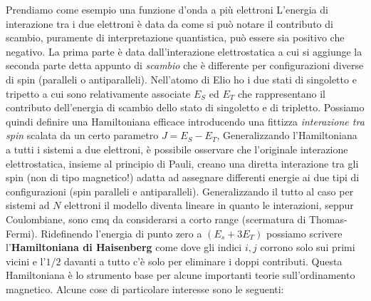 Prendiamo come esempio una funzione d'onda a pi\`u elettroni 
L'energia di interazione tra i due elettroni \`e data da
come si pu\`o notare il contributo di scambio, puramente di interpretazione quantistica, pu\`o essere sia positivo che negativo. La prima parte \`e data dall'interazione elettrostatica a cui si aggiunge la seconda parte detta appunto di \textit{scambio} che \`e differente per configurazioni diverse di spin (paralleli o antiparalleli). Nell'atomo di Elio ho i due stati di singoletto e tripetto a cui sono relativamente associate $E_S$ ed $E_T$ che rappresentano il contributo dell'energia di scambio dello stato di singoletto e di tripletto. Possiamo quindi definire una Hamiltoniana efficace introducendo una fittizza \textit{interazione tra spin} scalata da un certo parametro $J = E_S-E_T$, 
Generalizzando l'Hamiltoniana a tutti i sistemi a due elettroni, \`e possibile osservare che l'originale interazione elettrostatica, insieme al principio di Pauli, creano una diretta interazione tra gli spin (non di tipo magnetico!) adatta ad assegnare differenti energie ai due tipi di configurazioni (spin paralleli e antiparalleli). Generalizzando il tutto al caso per sistemi ad $N$ elettroni il modello diventa lineare in quanto le interazioni, seppur Coulombiane, sono cmq da considerarsi a corto range (scermatura di Thomas-Fermi). Ridefinendo l'energia di punto zero a $(E_s+3E_T)$ possiamo scrivere l'\textbf{Hamiltoniana di Haisenberg} come
dove gli indici $i,j$ corrono solo sui primi vicini e l'$1/2$ davanti a tutto c'\`e solo per eliminare i doppi contributi. Questa Hamiltoniana \`e lo strumento base per alcune importanti teorie sull'ordinamento magnetico. Alcune cose di particolare interesse sono le seguenti:
